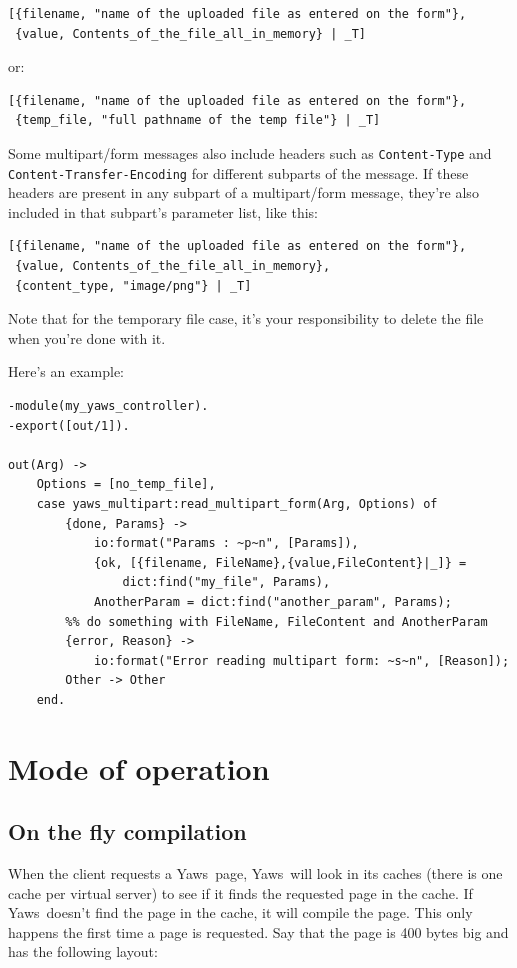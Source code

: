 \documentclass[11pt,oneside,english]{book}
\newcommand{\Yaws}            %
        {{\sc Yaws}}
\begin{document}
\begin{verbatim}
[{filename, "name of the uploaded file as entered on the form"},
 {value, Contents_of_the_file_all_in_memory} | _T]
\end{verbatim}

or:

\begin{verbatim}
[{filename, "name of the uploaded file as entered on the form"},
 {temp_file, "full pathname of the temp file"} | _T]
\end{verbatim}

Some multipart/form messages also include headers such as
\verb+Content-Type+ and \verb+Content-Transfer-Encoding+ for different
subparts of the message. If these headers are present in any subpart
of a multipart/form message, they're also included in that subpart's
parameter list, like this:

\begin{verbatim}
[{filename, "name of the uploaded file as entered on the form"},
 {value, Contents_of_the_file_all_in_memory},
 {content_type, "image/png"} | _T]
\end{verbatim}

Note that for the temporary file case, it's your responsibility to
delete the file when you're done with it.

Here's an example:

\begin{verbatim}
-module(my_yaws_controller).
-export([out/1]).

out(Arg) ->
    Options = [no_temp_file],
    case yaws_multipart:read_multipart_form(Arg, Options) of
        {done, Params} ->
            io:format("Params : ~p~n", [Params]),
            {ok, [{filename, FileName},{value,FileContent}|_]} =
                dict:find("my_file", Params),
            AnotherParam = dict:find("another_param", Params);
        %% do something with FileName, FileContent and AnotherParam
        {error, Reason} ->
            io:format("Error reading multipart form: ~s~n", [Reason]);
        Other -> Other
    end.
\end{verbatim}


\chapter{Mode of operation}

\section{On the fly compilation}
When the client requests a \Yaws\  page, \Yaws\  will look in its caches
(there is one cache per virtual server) to see if it finds the
requested page in the cache. If \Yaws\  doesn't find the page in the
cache, it will compile the page. This only happens the first time a
page is requested.
Say that the page is 400 bytes big and has the following layout:
\end{document}
